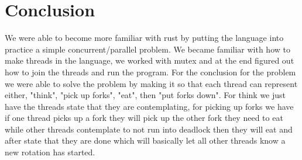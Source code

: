 \documentclass[conference]{IEEEtran}
\begin{document}
	\section{Conclusion}
	We were able to become more familiar with rust by putting the language into practice a simple concurrent/parallel problem. We became familiar with how to make threads in the language, we worked with mutex and  at the end figured out how to join the threads and run the program. 
	\linebreak
	For the conclusion for the problem we were able to solve the problem by making it so that each thread can represent either, "think", "pick up forks", "eat", then "put forks down". For think we just have the threads state that they are contemplating, for picking up forks we have if one thread picks up a fork they will pick up the other fork they need to eat while other threads contemplate to not run into deadlock then they will eat and after state that they are done which will basically let all other threads know a new rotation has started.

	\pagebreak
	
	
\end{document}
